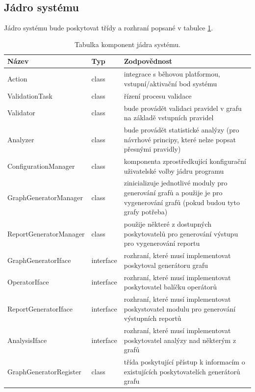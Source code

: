 
\subsection{Jádro systému}
Jádro systému bude poskytovat třídy a rozhraní popsané v tabulce \ref{design-archval_core_components}.

\begin{table}
  \caption{Tabulka komponent jádra systému. \label{design-archval_core_components}}
  \begin{center}
    \begin{tabular*}{1.0\textwidth}{@{\extracolsep{\fill}} | l | l | p{8cm} | }
      \hline
      \textbf{Název} & \textbf{Typ} & \textbf{Zodpovědnost} \\
      \hline
      \hline
      Action & class & integrace s běhovou platformou, vstupní/aktivační bod systému \\ \hline
      ValidationTask & class & řízení procesu validace \\ \hline
      Validator & class & bude provádět validaci pravidel v grafu na základě vstupních pravidel \\ \hline
      Analyzer & class & bude provádět statistické analýzy (pro návrhové principy, které nelze popsat přesnými pravidly) \\ \hline
      ConfigurationManager & class & komponenta zprostředkující konfigurační uživatelské volby jádru programu \\ \hline
      GraphGeneratorManager & class & zinicializuje jednotlivé moduly pro generování grafů a použije je pro vygenerování grafů (pokud budou tyto grafy potřeba) \\ \hline
      ReportGeneratorManager & class & použije některé z dostupných poskytovatelů pro generování výstupu pro vygenerování reportu \\ \hline
      GraphGeneratorIface & interface & rozhraní, které musí implementovat poskytoval generátoru grafu \\ \hline
      OperatorIface & interface & rozhraní, které musí implementovat poskytovatel balíčku operátorů \\ \hline
      ReportGeneratorIface & interface & rozhraní, které musí implementovat poskystovatel modulu pro generování výstupních reportů \\ \hline
      AnalysisIface & interface & rozhraní, které musí implementovat poskytovatel analýzy nad některým z grafů \\ \hline
      GraphGeneratorRegister & class & třída poskytující přístup k informacím o existujících poskytovatelích generátorů grafu \\ \hline

\end{tabular*}
\end{center}
\end{table}
